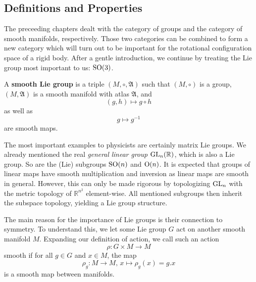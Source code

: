 \subsection{Definitions and Properties}
The preceeding chapters dealt with the category of groups and the category of smooth manifolds, respectively. Those two categories can be combined to form a new category which will turn out to be important for the rotational configuration space of a rigid body. After a gentle introduction, we continue by treating the Lie group most important to us: $\operatorname{SO}(3)$.
\begin{definition}
    A \textbf{smooth Lie group} is a triple $(M, \circ, \mathfrak{A})$ such that $(M, \circ)$ is a group, $(M, \mathfrak{A})$ is a smooth manifold with atlas $\mathfrak{A}$, and \[
        (g,h) \mapsto g \circ h
    \]
    as well as \[
        g \mapsto g^{-1}
    \] are smooth maps. 
\end{definition}

\begin{eg}
    The most important examples to physicists are certainly matrix Lie groups. We already mentioned the real \emph{general linear group} $\operatorname{GL}_n(\mathbb{R})$, which is also a Lie group. So are the (Lie) subgroups $\operatorname{SO}(n)$ and $\operatorname{O} (n)$. It is expected that groups of linear maps have smooth multiplication and inversion as linear maps are smooth in general. However, this can only be made rigorous by topologizing $\operatorname{GL}_n$ with the metric topology of $\mathbb{R}^{n^2}$ element-wise. All mentioned subgroups then inherit the subspace topology, yielding a Lie group structure.
\end{eg}
The main reason for the importance of Lie groups is their connection to symmetry. To understand this, we let some Lie group $G$ act on another smooth manifold $M$. Expanding our definition of action, we call such an action
\[
\rho: G \times M \to M
\] smooth if for all $g \in G$ and $x \in M$, the map
\[
\rho_g: M \to M, \, x \mapsto \rho_g(x)=g.x
\] is a smooth map between manifolds.



